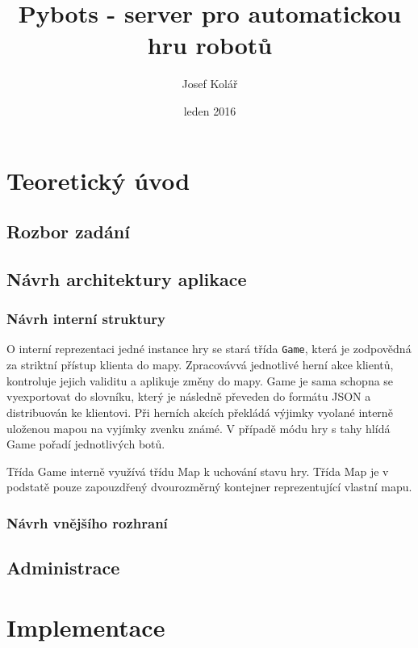 \documentclass[16pt,titlepage,a4paper]{article}
\begin{document}
    \title{Pybots - server pro automatickou hru robotů}
    \author{Josef Kolář}
    \date{leden 2016}


\maketitle
\tableofcontents
\newpage


\section{Teoretický úvod}

\subsection{Rozbor zadání}

\subsection{Návrh architektury aplikace}

\subsubsection{Návrh interní struktury}

O interní reprezentaci jedné instance hry se stará třída \lstinline|Game|, která je zodpovědná za striktní přístup klienta do mapy. Zpracovávvá jednotlivé herní akce klientů, kontroluje jejich validitu a aplikuje změny do mapy. Game je sama schopna se vyexportovat do slovníku, který je následně převeden do formátu JSON a distribuován ke klientovi. Při herních akcích překládá výjimky vyolané interně uloženou mapou na vyjímky zvenku známé. V případě módu hry s tahy hlídá Game pořadí jednotlivých botů.

Třída Game interně využívá třídu Map k uchování stavu hry. Třída Map je v podstatě pouze zapouzdřený dvourozměrný kontejner reprezentující vlastní mapu. 


\subsubsection{Návrh vnějšího rozhraní}

\subsection{Administrace}

\section{Implementace}
\end{document}
